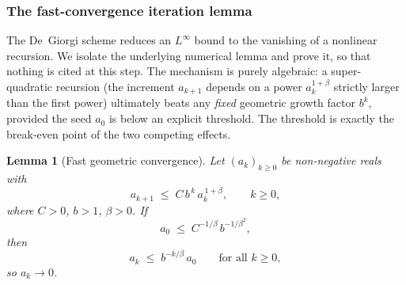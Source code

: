 \documentclass[11pt]{amsart}
\newtheorem{lemma}[theorem]{Lemma}
\theoremstyle{definition}
\begin{document}
\subsubsection{The fast-convergence iteration lemma}\label{ssec:DG-lemma}

The De~Giorgi scheme reduces an $L^\infty$ bound to the vanishing of a
nonlinear recursion. We isolate the underlying numerical lemma and prove
it, so that nothing is cited at this step. The mechanism is purely
algebraic: a super-quadratic recursion (the increment $a_{k+1}$ depends
on a power $a_k^{1+\beta}$ strictly larger than the first power)
ultimately beats any \emph{fixed} geometric growth factor $b^k$, provided
the seed $a_0$ is below an explicit threshold. The threshold is exactly
the break-even point of the two competing effects.

\begin{lemma}[Fast geometric convergence]\label{lem:DG-iteration2}
Let $(a_k)_{k\ge0}$ be non-negative reals with
\begin{equation}\label{eq:DG-recursion2}
   a_{k+1}\;\le\;C\,b^{\,k}\,a_k^{\,1+\beta},\qquad k\ge0,
\end{equation}
where $C>0$, $b>1$, $\beta>0$. If
\begin{equation}\label{eq:DG-smallness2}
   a_0\;\le\;C^{-1/\beta}\,b^{-1/\beta^2},
\end{equation}
then
\begin{equation}\label{eq:DG-conclusion}
   a_k\;\le\;b^{-k/\beta}\,a_0\qquad\text{for all }k\ge0,
\end{equation}
so $a_k\to0$.
\end{lemma}
\end{document}
